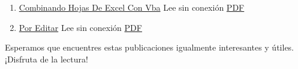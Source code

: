 \documentclass[
  jou,
  floatsintext,
  longtable,
  a4paper,
  nolmodern,
  notxfonts,
  notimes,
  colorlinks=true,linkcolor=blue,citecolor=blue,urlcolor=blue]{apa7}
\begin{document}
\begin{enumerate}
{  Eventos} Lee sin conexión
  \href{https://achalmaedison.netlify.app/herramientas-oficina/ofimatica/2023-01-23-08-eventos/index.pdf}{PDF}
\item
  \href{https://achalmaedison.netlify.app/herramientas-oficina/ofimatica/2023-05-31-combinando-hojas-de-excel-con-vba}{Combinando
  Hojas De Excel Con Vba} Lee sin conexión
  \href{https://achalmaedison.netlify.app/herramientas-oficina/ofimatica/2023-05-31-combinando-hojas-de-excel-con-vba/index.pdf}{PDF}
\item
  \href{https://achalmaedison.netlify.app/herramientas-oficina/ofimatica/2024-03-31-por-editar}{Por
  Editar} Lee sin conexión
  \href{https://achalmaedison.netlify.app/herramientas-oficina/ofimatica/2024-03-31-por-editar/index.pdf}{PDF}
\end{enumerate}

Esperamos que encuentres estas publicaciones igualmente interesantes y
útiles. ¡Disfruta de la lectura!
\end{document}
